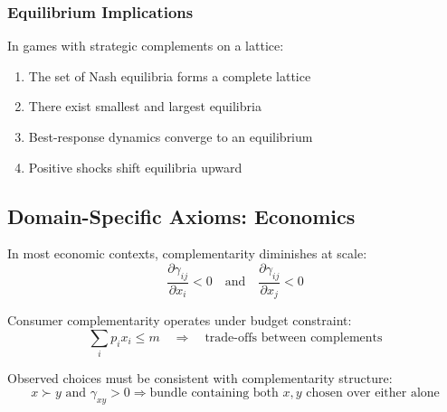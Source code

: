 \subsubsection{Equilibrium Implications}

\begin{theorem}
In games with strategic complements on a lattice:
\begin{enumerate}
    \item The set of Nash equilibria forms a complete lattice
    \item There exist smallest and largest equilibria
    \item Best-response dynamics converge to an equilibrium
    \item Positive shocks shift equilibria upward
\end{enumerate}
\end{theorem}

\subsection{Domain-Specific Axioms: Economics}

\begin{axiom}
In most economic contexts, complementarity diminishes at scale:
\begin{equation}
\frac{\partial \gamma_{ij}}{\partial x_i} < 0 \quad \text{and} \quad \frac{\partial \gamma_{ij}}{\partial x_j} < 0
\end{equation}
\end{axiom}

\begin{axiom}
Consumer complementarity operates under budget constraint:
\begin{equation}
\sum_i p_i x_i \leq m \quad \Rightarrow \quad \text{trade-offs between complements}
\end{equation}
\end{axiom}

\begin{axiom}
Observed choices must be consistent with complementarity structure:
\begin{equation}
x \succ y \text{ and } \gamma_{xy} > 0 \Rightarrow \text{bundle containing both } x,y \text{ chosen over either alone}
\end{equation}
\end{axiom}

